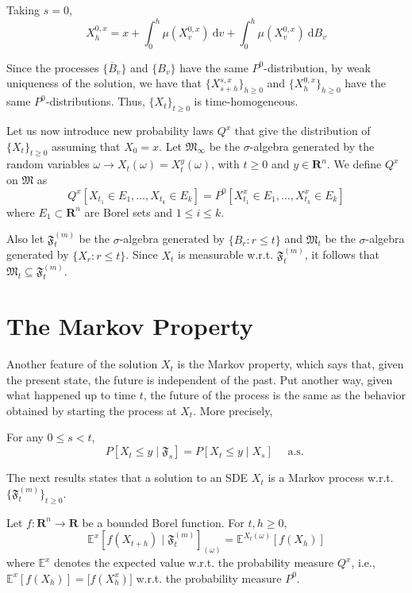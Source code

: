 Taking $s = 0$, 
\[
    X_{h}^{0,x} = x + \int_0^{h} \mu(X_{v}^{0,x})~\mathrm{d}v + \int_0^{h} \mu(X_{v}^{0,x})~\mathrm{d}B_v
\]

Since the processes $\{ \overline{B}_v \}$ and $\{ B_v \}$ have the same $P^0$-distribution, by weak uniqueness of the solution, we have that $\{ X_{s+h}^{s,x} \}_{h \geq 0}$ and $\{ X_h^{0,x} \}_{h \geq 0}$ have the same $P^0$-distributions. Thus, $\{ X_t \}_{t \geq 0}$ is time-homogeneous. 

Let us now introduce new probability laws $Q^x$ that give the distribution of $\{ X_t \}_{t \geq 0}$ assuming that $X_0 = x$. Let $\mathfrak{M}_\infty$ be the $\sigma$-algebra generated by the random variables $\omega \longrightarrow X_t(\omega) = X_t^y(\omega)$, with $t \geq 0$ and $y \in \textbf{R}^n$. We define $Q^x$ on $\mathfrak{M}$ as
\[
    Q^x [X_{t_1} \in E_1, \ldots, X_{t_k} \in E_k] = P^0[X_{t_1}^x \in E_1, \ldots, X_{t_k}^x \in E_k]
\]
where $E_1 \subset \textbf{R}^n$ are Borel sets and $1 \leq i \leq k$. 

Also let $\mathfrak{F}_t^{(m)}$ be the $\sigma$-algebra generated by $\{ B_r : r \leq t\}$ and $\mathfrak{M}_t$ be the $\sigma$-algebra generated by $\{ X_r : r \leq t\}$. Since $X_t$ is measurable w.r.t. $\mathfrak{F}_t^{(m)}$, it follows that $\mathfrak{M}_t \subseteq \mathfrak{F}_t^{(m)}$.

\section{The Markov Property}

Another feature of the solution $X_t$ is the Markov property, which says that, given the present state, the future is independent of the past. Put another way, given what happened up to time $t$, the future of the process is the same as the behavior obtained by starting the process at $X_t$. More precisely, 

\begin{definition}
    For any $0 \leq s < t$,
    \[
        P[X_t \leq y \mid \mathfrak{F}_s] = P[X_t \leq y \mid X_s] \quad \text{ a.s. }
    \]
\end{definition}

The next results states that a solution to an SDE $X_t$ is a Markov process w.r.t. $\{ \mathfrak{F}_t^{(m)} \}_{t \geq 0}$. 

\begin{theorem}\label{thm:markov_prop_ito}
    Let $f : \textbf{R}^n \longrightarrow \textbf{R}$ be a bounded Borel function. For $t, h \geq 0$, 
    \begin{equation}\label{eq:markov_property}
        \mathbb{E}^x [f(X_{t+h}) \mid \mathfrak{F}_t^{(m)}]_{(\omega)} = \mathbb{E}^{X_t(\omega)} [f(X_h)]
    \end{equation}
    where $\mathbb{E}^x$ denotes the expected value w.r.t. the probability measure $Q^x$, i.e., $\mathbb{E}^x[f(X_h)] = \mathbb[f(X_h^x)]$ w.r.t. the probability measure $P^0$. 
\end{theorem}

